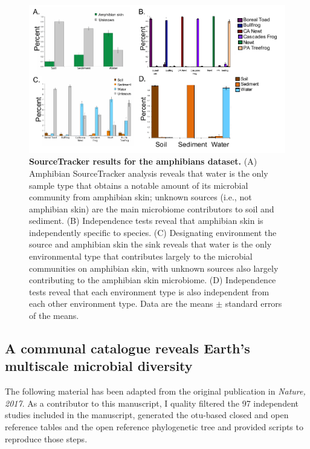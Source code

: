\begin{figure}[htbp]
\includegraphics[width=\columnwidth]{chapter_contributions_figures/AmphibiansST.pdf}
\caption[SourceTracker results for the amphibians dataset]{\textbf{SourceTracker results for the amphibians dataset.}
(A) Amphibian SourceTracker analysis reveals that water is the only sample type
that obtains a notable amount of its microbial community from amphibian skin; unknown sources
(i.e., not amphibian skin) are the main microbiome contributors to soil and sediment.
(B) Independence tests reveal that amphibian skin is independently specific to species.
(C) Designating environment the source and amphibian skin the sink reveals that water
is the only environmental type that contributes largely to the microbial communities
on amphibian skin, with unknown sources also largely contributing to the amphibian
skin microbiome. (D) Independence tests reveal that each environment type is also
independent from each other environment type. Data are the means $\pm$ standard
errors of the means.}
\label{AmphibianST}
\end{figure}

\subsection{A communal catalogue reveals Earth's multiscale microbial diversity}\label{subsection_emp}

The following material has been adapted from the original publication in
\textsl{Nature, 2017}. As a contributor to this manuscript, I quality filtered the
97 independent studies included in the manuscript, generated the \gls{otu}-based
closed and open reference tables and the open reference phylogenetic tree and provided
scripts to reproduce those steps.

